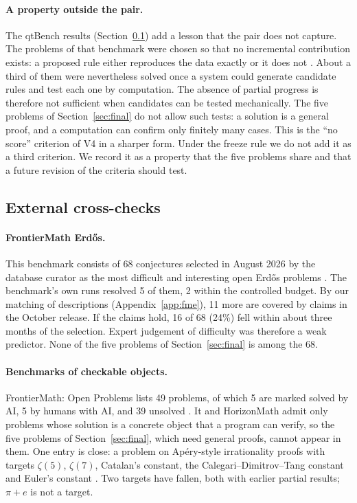 \documentclass[11pt,a4paper]{article}
\theoremstyle{prob}
\begin{document}
\paragraph{A property outside the pair.} The qtBench results (Section~\ref{sec:crosschecks}) add a lesson that the pair does not capture. The problems of that benchmark were chosen so that no incremental contribution exists: a proposed rule either reproduces the data exactly or it does not \cite{combi}. About a third of them were nevertheless solved once a system could generate candidate rules and test each one by computation. The absence of partial progress is therefore not sufficient when candidates can be tested mechanically. The five problems of Section~\ref{sec:final} do not allow such tests: a solution is a general proof, and a computation can confirm only finitely many cases. This is the ``no score'' criterion of V4 in a sharper form. Under the freeze rule we do not add it as a third criterion. We record it as a property that the five problems share and that a future revision of the criteria should test.

\subsection{External cross-checks}\label{sec:crosschecks}

\paragraph{FrontierMath Erd\H{o}s.} This benchmark consists of 68 conjectures selected in August 2026 by the database curator as the most difficult and interesting open Erd\H{o}s problems \cite{fme}. The benchmark's own runs resolved 5 of them, 2 within the controlled budget. By our matching of descriptions (Appendix~\ref{app:fme}), 11 more are covered by claims in the October release. If the claims hold, 16 of 68 (24\%) fell within about three months of the selection. Expert judgement of difficulty was therefore a weak predictor. None of the five problems of Section~\ref{sec:final} is among the 68.



\paragraph{Benchmarks of checkable objects.} FrontierMath: Open Problems lists 49 problems, of which 5 are marked solved by AI, 5 by humans with AI, and 39 unsolved \cite{fmop}. It and HorizonMath \cite{horizon} admit only problems whose solution is a concrete object that a program can verify, so the five problems of Section~\ref{sec:final}, which need general proofs, cannot appear in them. One entry is close: a problem on Ap\'ery-style irrationality proofs with targets $\zeta(5)$, $\zeta(7)$, Catalan's constant, the Calegari--Dimitrov--Tang constant and Euler's constant \cite{fmapery}. Two targets have fallen, both with earlier partial results; $\pi+e$ is not a target.
\end{document}
